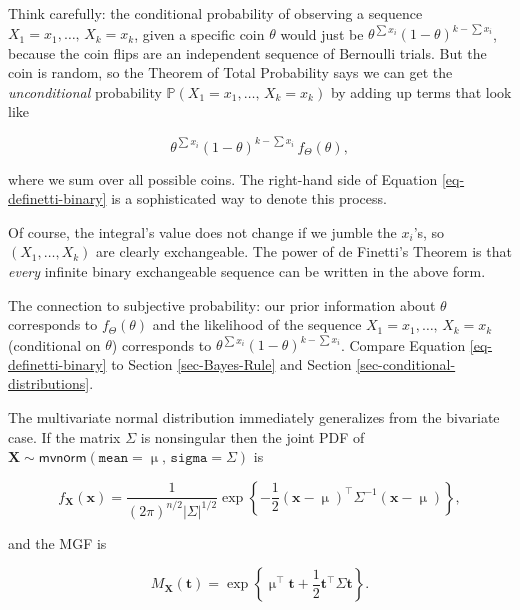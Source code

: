 \documentclass[]{book}
\numberwithin{equation}{chapter}
\numberwithin{figure}{chapter}
\theoremstyle{plain}
\theoremstyle{definition}
\theoremstyle{remark}
\theoremstyle{definition}
\theoremstyle{definition}
\theoremstyle{remark}
\begin{document}
Think carefully: the conditional probability of observing a sequence
\(X_{1}=x_{1},\ldots,\, X_{k}=x_{k}\), given a specific coin \(\theta\)
would just be \(\theta^{\sum x_{i}}(1-\theta)^{k-\sum x_{i}}\), because
the coin flips are an independent sequence of Bernoulli trials. But the
coin is random, so the Theorem of Total Probability says we can get the
\emph{unconditional} probability
\(\mathbb{P}(X_{1}=x_{1},\ldots,\, X_{k}=x_{k})\) by adding up terms
that look like

\begin{equation}
\theta^{\sum x_{i}}(1-\theta)^{k-\sum x_{i}}\, f_{\Theta}(\theta),
\end{equation}

where we sum over all possible coins. The right-hand side of Equation
\eqref{eq-definetti-binary} is a sophisticated way to denote this
process.

Of course, the integral's value does not change if we jumble the
\(x_{i}\)'s, so \((X_{1},\ldots,X_{k})\) are clearly exchangeable. The
power of de Finetti's Theorem is that \emph{every} infinite binary
exchangeable sequence can be written in the above form.

The connection to subjective probability: our prior information about
\(\theta\) corresponds to \(f_{\Theta}(\theta)\) and the likelihood of
the sequence \(X_{1}=x_{1},\ldots,\, X_{k}=x_{k}\) (conditional on
\(\theta\)) corresponds to
\(\theta^{\sum x_{i}}(1-\theta)^{k-\sum x_{i}}\). Compare Equation
\eqref{eq-definetti-binary} to Section \ref{sec-Bayes-Rule} and Section
\ref{sec-conditional-distributions}.

The multivariate normal distribution immediately generalizes from the
bivariate case. If the matrix \(\Sigma\) is nonsingular then the joint
PDF of
\(\mathbf{X}\sim\mathsf{mvnorm}(\mathtt{mean}=\upmu,\,\mathtt{sigma}=\Sigma)\)
is

\begin{equation}
f_{\mathbf{X}}(\mathbf{x})=\frac{1}{(2\pi)^{n/2}\left|\Sigma\right|^{1/2}}\exp\left\{ -\frac{1}{2}\left(\mathbf{x}-\upmu\right)^{\top}\Sigma^{-1}\left(\mathbf{x}-\upmu\right)\right\},
\end{equation}

and the MGF is

\begin{equation}
M_{\mathbf{X}}(\mathbf{t})=\exp\left\{ \upmu^{\top}\mathbf{t}+\frac{1}{2}\mathbf{t}^{\top}\Sigma\mathbf{t}\right\}.
\end{equation}
\end{document}
